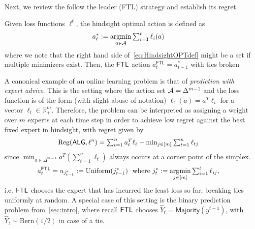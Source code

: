 Next, we review the follow the leader (FTL) strategy and establish its regret. 
\begin{definition}[$\ftl$] \label{def:FTL}
Given loss functions $\ell^{t}$, the hindsight optimal action is defined as  
\begin{align} \label{eq:HindsightOPTdef}
    a^*_t \mathrel{\mathop{:}}= \operatorname*{\arg\!\min}_{a \in \mathcal{A}} \textstyle\sum_{i=1}^{t} \ell_i(a) 
\end{align}
where we note that the right hand side of~\cref{eq:HindsightOPTdef} might be a set if multiple minimizers exist. 
Then, the $\ftl$ action $a^{\mathsf{FTL}}_t = a^*_{t-1}$ with ties broken 
\end{definition}

A canonical example of an online learning problem is that of \emph{prediction with expert advice}. This is the setting where the action set $\mathcal{A} = \Delta^{m-1}$ and the loss function is of the form (with slight abuse of notation) $\ell_t(a) = a^T \ell_t$ for a vector $\ell_t \in \mathbb{R}^m_{+}$. Therefore, the problem can be interpreted as assigning a weight over $m$ experts at each time step in order to achieve low regret against the best fixed expert in hindsight, with regret given by
\begin{align}\label{eq:PWERegDef}
    \mathrm{Reg}(\mathsf{ALG},\ell^n) = \textstyle\sum_{t=1}^n a_t^T \ell_t - \min_{j \in [m]} \textstyle\sum_{t=1}^n \ell_{tj}
\end{align}
since $\min_{a \in \Delta^{m-1}} a^T\left(\sum_{t=1}^n \ell_t \right)$ always occurs at a corner point of the simplex. 
\begin{align} \label{eq:FTLPWEDef}
    a^{\mathsf{FTL}}_t =  u_{j^*_{t-1}} \mathrel{\mathop{:}}= \mathrm{Uniform}({j^*_{t-1}})
    ~\text{ where }
    j^*_{t} \mathrel{\mathop{:}}= \operatorname*{\arg\!\min}_{j \in [m]} \textstyle\sum_{i=1}^{t} \ell_{ij},
 \end{align}
i.e. $\ftl$ chooses the expert that has incurred the least loss so far, breaking ties uniformly at random.  
A special case of this setting is the binary prediction problem from~\cref{sec:intro}, where recall $\ftl$ chooses $\widehat{Y}_t = \mathsf{Majority}(y^{t-1})$, with $\widehat{Y}_t \sim \mathrm{Bern}(1/2)$ in case of a tie. 


